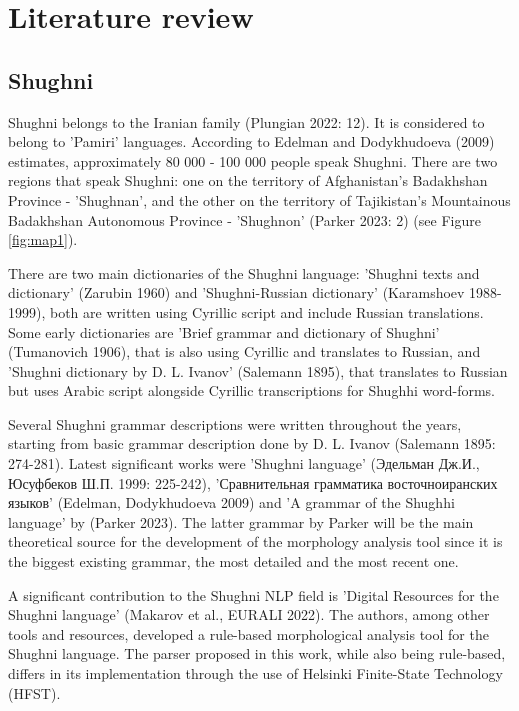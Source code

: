 \section{Literature review}
\subsection{Shughni}
\par Shughni belongs to the Iranian family (Plungian 2022: 12). It is considered to belong to 'Pamiri' languages. According to Edelman and Dodykhudoeva (2009) estimates, approximately 80 000 - 100 000 people speak Shughni. There are two regions that speak Shughni: one on the territory of Afghanistan's Badakhshan Province - 'Shughnan', and the other on the territory of Tajikistan's Mountainous Badakhshan Autonomous Province - 'Shughnon' (Parker 2023: 2) (see Figure \ref{fig:map1}).
\par There are two main dictionaries of the Shughni language: 'Shughni texts and dictionary' (Zarubin 1960) and 'Shughni-Russian dictionary' (Karamshoev 1988-1999), both are written using Cyrillic script and include Russian translations. Some early dictionaries are 'Brief grammar and dictionary of Shughni' (Tumanovich 1906), that is also using Cyrillic and translates to Russian, and 'Shughni dictionary by D. L. Ivanov' (Salemann 1895), that translates to Russian but uses Arabic script alongside Cyrillic transcriptions for Shughhi word-forms.
\par Several Shughni grammar descriptions were written throughout the years, starting from basic grammar description done by D. L. Ivanov (Salemann 1895: 274-281). Latest significant works were 'Shughni language' (Эдельман Дж.И., Юсуфбеков Ш.П. 1999: 225-242), 'Сравнительная грамматика восточноиранских языков' (Edelman, Dodykhudoeva 2009) and 'A grammar of the Shughhi language' by (Parker 2023). The latter grammar by Parker will be the main theoretical source for the development of the morphology analysis tool since it is the biggest existing grammar, the most detailed and the most recent one.
\par A significant contribution to the Shughni NLP field is 'Digital Resources for the Shughni language' (Makarov et al., EURALI 2022). The authors, among other tools and resources, developed a rule-based morphological analysis tool for the Shughni language. The parser proposed in this work, while also being rule-based, differs in its implementation through the use of Helsinki Finite-State Technology (HFST).

